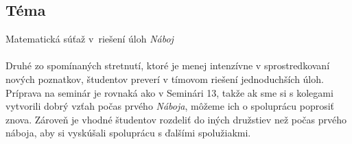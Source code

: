 

\subsection*{Téma}
Matematická súťaž v~riešení úloh \textit{Náboj}\\
\\
\kom Druhé zo spomínaných stretnutí, ktoré je menej intenzívne v sprostredkovaní nových poznatkov, študentov preverí v tímovom riešení jednoduchších úloh. Príprava na seminár je rovnaká ako v Seminári 13, takže ak sme si s kolegami vytvorili dobrý vzťah počas prvého \textit{Náboja}, môžeme ich o spoluprácu poprosiť znova. Zároveň je vhodné študentov rozdeliť do iných družstiev než počas prvého náboja, aby si vyskúšali spoluprácu s ďalšími spolužiakmi.
